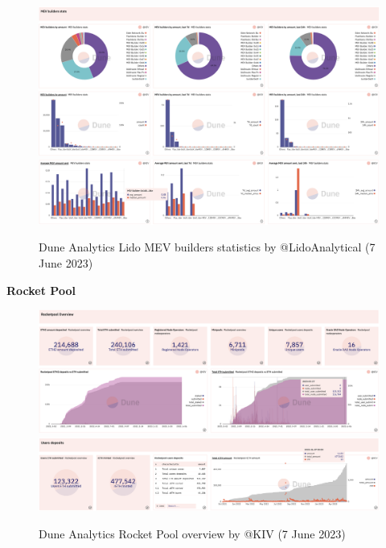 \documentclass[UTF8]{article}
\begin{document}
{\begin{figure}[htbp]
\begin{center}
\includegraphics[width=\linewidth]{images/dunelido4}\\
\includegraphics[width=\linewidth]{images/dunelido5}
\caption{Dune Analytics Lido MEV builders statistics by @LidoAnalytical  (7 June 2023)}
\label{fig:dunelido5}
\end{center}
\end{figure}
\noindent
\clearpage
\noindent

\textbf{Rocket Pool}
\begin{figure}[htbp]
\begin{center}
\includegraphics[width=\linewidth]{images/dunerocket1}\\
\includegraphics[width=\linewidth]{images/dunerocket2}
\caption{Dune Analytics Rocket Pool overview by @KIV  (7 June 2023)}
\label{fig:dunerocket1}
\end{center}
\end{figure}

}
\end{document}
